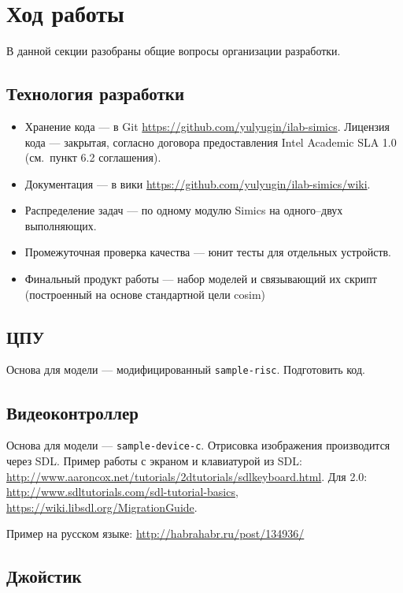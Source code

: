 \section{Ход работы}

В данной секции разобраны общие вопросы организации разработки.
\subsection{Технология разработки}

\begin{itemize}
\item Хранение кода --- в Git \url{https://github.com/yulyugin/ilab-simics}. Лицензия кода --- закрытая, согласно договора предоставления Intel Academic SLA 1.0 (см.~пункт 6.2 соглашения).

\item Документация --- в вики \url{https://github.com/yulyugin/ilab-simics/wiki}.

\item Распределение задач --- по одному модулю Simics на одного--двух выполняющих.
\item Промежуточная проверка качества --- юнит тесты для отдельных устройств.
\item Финальный продукт работы --- набор моделей и связывающий их скрипт (построенный на основе стандартной цели cosim)
\end{itemize}

\subsection{ЦПУ}

Основа для модели --- модифицированный \texttt{sample-risc}. \todo Подготовить код.

\subsection{Видеоконтроллер}

Основа для модели --- \texttt{sample-device-c}. Отрисовка изображения производится через SDL. Пример работы с экраном и клавиатурой из SDL: \url{http://www.aaroncox.net/tutorials/2dtutorials/sdlkeyboard.html}. Для 2.0: \url{http://www.sdltutorials.com/sdl-tutorial-basics}, \url{https://wiki.libsdl.org/MigrationGuide}.

Пример на русском языке: \url{http://habrahabr.ru/post/134936/}

\subsection{Джойстик}


